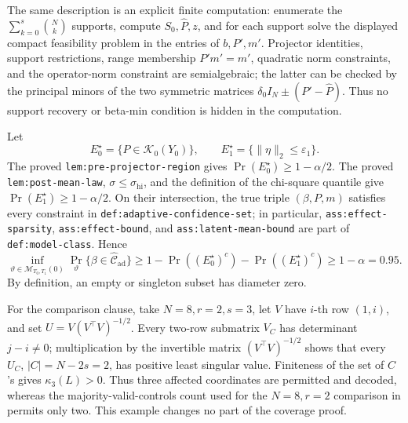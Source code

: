 The same description is an explicit finite computation: enumerate the \(\sum_{k=0}^s{N\choose k}\) supports, compute \(S_0,\widehat P,z\), and for each support solve the displayed compact feasibility problem in the entries of \(b,P',m'\).  Projector identities, support restrictions, range membership \(P'm'=m'\), quadratic norm constraints, and the operator-norm constraint are semialgebraic; the latter can be checked by the principal minors of the two symmetric matrices \(\delta_0I_N\pm(P'-\widehat P)\).  Thus no support recovery or beta-min condition is hidden in the computation.

Let
\[
 E_0^\star=\{P\in\mathcal K_0(Y_0)\},
 \qquad
 E_1^\star=\{\lVert\eta\rVert_2\le\varepsilon_1\}.
\]
The proved \texttt{lem:pre-projector-region} gives \(\Pr(E_0^\star)\ge1-\alpha/2\).  The proved \texttt{lem:post-mean-law}, \(\sigma\le\sigma_{\mathrm{hi}}\), and the definition of the chi-square quantile give \(\Pr(E_1^\star)\ge1-\alpha/2\).  On their intersection, the true triple \((\beta,P,m)\) satisfies every constraint in \texttt{def:adaptive-confidence-set}; in particular, \texttt{ass:effect-sparsity}, \texttt{ass:effect-bound}, and \texttt{ass:latent-mean-bound} are part of \texttt{def:model-class}.  Hence
\[
 \inf_{\vartheta\in\mathcal M_{T_0,T_1}(0)}
 \Pr_\vartheta\{\beta\in\widehat{\mathcal C}_{\mathrm{ad}}\}
 \ge1-\Pr((E_0^\star)^c)-\Pr((E_1^\star)^c)
 \ge1-\alpha=0.95.
\]
By definition, an empty or singleton subset has diameter zero.

For the comparison clause, take \(N=8,r=2,s=3\), let \(V\) have \(i\)-th row \((1,i)\), and set \(U=V(V^{\top}V)^{-1/2}\).  Every two-row submatrix \(V_C\) has determinant \(j-i\ne0\); multiplication by the invertible matrix \((V^{\top}V)^{-1/2}\) shows that every \(U_C\), \(|C|=N-2s=2\), has positive least singular value.  Finiteness of the set of \(C\)'s gives \(\kappa_3(L)>0\).  Thus three affected coordinates are permitted and decoded, whereas the majority-valid-controls count used for the \(N=8,r=2\) comparison in \cite{HeLiShiMiao2026} permits only two.  This example changes no part of the coverage proof.

